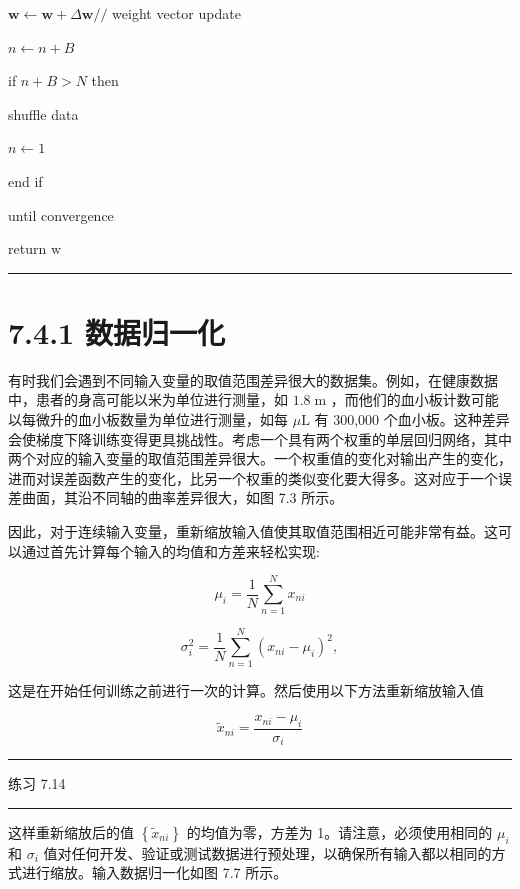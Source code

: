\documentclass[10pt]{report}
\newcommand{\HRule}{\begin{center}\rule{0.9\linewidth}{0.2mm}\end{center}}
\begin{document}
\hspace*{1em} \(\mathbf{w} \leftarrow  \mathbf{w} + \Delta \mathbf{w}//\) weight vector update

\hspace*{1em} \(n \leftarrow  n + B\)

\hspace*{1em} if \(n + B > N\) then

\hspace*{2em} shuffle data

\hspace*{2em} \(n \leftarrow  1\)

\hspace*{1em} end if

until convergence

return \(\mathrm{w}\)

\HRule

\section*{7.4.1 数据归一化}

有时我们会遇到不同输入变量的取值范围差异很大的数据集。例如，在健康数据中，患者的身高可能以米为单位进行测量，如 \({1.8}\mathrm{\;m}\) ，而他们的血小板计数可能以每微升的血小板数量为单位进行测量，如每 \(\mu \mathrm{L}\) 有 300,000 个血小板。这种差异会使梯度下降训练变得更具挑战性。考虑一个具有两个权重的单层回归网络，其中两个对应的输入变量的取值范围差异很大。一个权重值的变化对输出产生的变化，进而对误差函数产生的变化，比另一个权重的类似变化要大得多。这对应于一个误差曲面，其沿不同轴的曲率差异很大，如图 7.3 所示。

因此，对于连续输入变量，重新缩放输入值使其取值范围相近可能非常有益。这可以通过首先计算每个输入的均值和方差来轻松实现:

\[
{\mu }_{i} = \frac{1}{N}\mathop{\sum }\limits_{{n = 1}}^{N}{x}_{ni} \tag{7.48}
\]

\[
{\sigma }_{i}^{2} = \frac{1}{N}\mathop{\sum }\limits_{{n = 1}}^{N}{\left( {x}_{ni} - {\mu }_{i}\right) }^{2}, \tag{7.49}
\]

这是在开始任何训练之前进行一次的计算。然后使用以下方法重新缩放输入值

\[
{\widetilde{x}}_{ni} = \frac{{x}_{ni} - {\mu }_{i}}{{\sigma }_{i}} \tag{7.50}
\]

\HRule

练习 7.14

\HRule

这样重新缩放后的值 \(\left\{  {\widetilde{x}}_{ni}\right\}\) 的均值为零，方差为 1。请注意，必须使用相同的 \({\mu }_{i}\) 和 \({\sigma }_{i}\) 值对任何开发、验证或测试数据进行预处理，以确保所有输入都以相同的方式进行缩放。输入数据归一化如图 7.7 所示。
\end{document}
